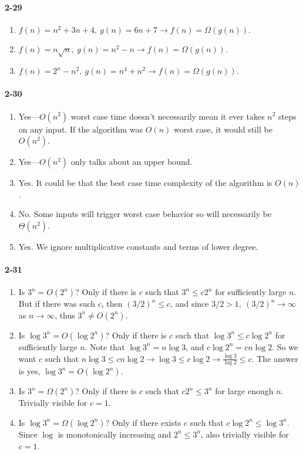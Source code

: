 \documentclass{report}
\begin{document}
\paragraph{2-29}
\begin{enumerate}[label=(\alph*)]
	\item $f(n) = n^2 + 3n + 4,\ g(n) = 6n + 7 \to f(n) = \Omega(g(n))$.
	\item $f(n) = n\sqrt{n},\ g(n)=n^2-n \to f(n) = \Omega(g(n))$.
	\item $f(n) = 2^n-n^2,\ g(n)=n^4+n^2 \to f(n) = \Omega(g(n))$.
\end{enumerate}

\paragraph{2-30}
\begin{enumerate}[label=(\alph*)]
	\item Yes---$O(n^2)$ worst case time doesn't necessarily mean it ever takes $n^2$ steps on any input. If the algorithm was $O(n)$ worst case, it would still be $O(n^2)$.
	\item Yes---$O(n^2)$ only talks about an upper bound.
	\item Yes. It could be that the best case time complexity of the algorithm is $O(n)$.
	\item No. Some inputs will trigger worst case behavior so will necessarily be $\Theta(n^2)$.
	\item Yes. We ignore multiplicative constants and terms of lower degree.
\end{enumerate}

\paragraph{2-31}
\begin{enumerate}[label=(\alph*)]
	\item Is $3^n = O(2^n)$? Only if there is $c$ such that $3^n \le c 2^n$ for sufficiently large $n$. But if there was such $c$, then $(3/2)^n \le c$, and since $3/2 > 1,\ (3/2)^n\to\infty$ as $n\to\infty$, thus $3^n \ne O(2^n)$.
	\item Is $\log 3^n = O(\log 2^n)$? Only if there is $c$ such that $\log 3^n \le c\log 2^n$ for sufficiently large $n$. Note that $\log 3^n = n\log 3$, and $c\log 2^n = cn\log 2$. So we want $c$ such that $n\log 3 \le cn\log2 \to \log 3 \le c\log2 \to \frac{\log 3}{\log 2} \le c$. The answer is yes, $\log 3^n = O(\log 2^n)$.
	\item Is $3^n = \Omega(2^n)$? Only if there is $c$ such that $c 2^n \le 3^n$ for large enough $n$. Trivially visible for $c=1$.
	\item Is $\log 3^n = \Omega(\log 2^n)$? Only if there exists $c$ such that $c\log 2^n \le \log 3^n$. Since $\log$ is monotonically increasing and $2^n \le 3^n$, also trivially visible for $c=1$.
\end{enumerate}
\end{document}

